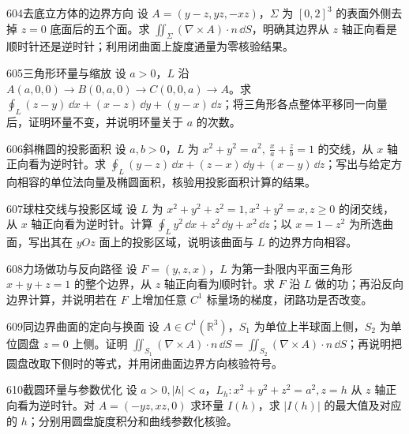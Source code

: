 \begin{exercise}{604}{去底立方体的边界方向}
设 $A=(y-z,yz,-xz)$，$\Sigma$ 为 $[0,2]^3$ 的表面外侧去掉 $z=0$ 底面后的五个面。求 $\iint_{\Sigma}(\nabla\times A)\cdot n\,\dd S$，明确其边界从 $z$ 轴正向看是顺时针还是逆时针；利用闭曲面上旋度通量为零核验结果。
\end{exercise}
\begin{exercise}{605}{三角形环量与缩放}
设 $a>0$，$L$ 沿 $A(a,0,0)\to B(0,a,0)\to C(0,0,a)\to A$。求 $\oint_L(z-y)\,\dd x+(x-z)\,\dd y+(y-x)\,\dd z$；将三角形各点整体平移同一向量后，证明环量不变，并说明环量关于 $a$ 的次数。
\end{exercise}
\begin{exercise}{606}{斜椭圆的投影面积}
设 $a,b>0$，$L$ 为 $x^2+y^2=a^2,\ \frac xa+\frac zb=1$ 的交线，从 $x$ 轴正向看为逆时针。求 $\oint_L(y-z)\,\dd x+(z-x)\,\dd y+(x-y)\,\dd z$；写出与给定方向相容的单位法向量及椭圆面积，核验用投影面积计算的结果。
\end{exercise}
\begin{exercise}{607}{球柱交线与投影区域}
设 $L$ 为 $x^2+y^2+z^2=1,x^2+y^2=x,z\ge0$ 的闭交线，从 $x$ 轴正向看为逆时针。计算 $\oint_Ly^2\,\dd x+z^2\,\dd y+x^2\,\dd z$；以 $x=1-z^2$ 为所选曲面，写出其在 $yOz$ 面上的投影区域，说明该曲面与 $L$ 的边界方向相容。
\end{exercise}
\begin{exercise}{608}{力场做功与反向路径}
设 $F=(y,z,x)$，$L$ 为第一卦限内平面三角形 $x+y+z=1$ 的整个边界，从 $z$ 轴正向看为顺时针。求 $F$ 沿 $L$ 做的功；再沿反向边界计算，并说明若在 $F$ 上增加任意 $C^1$ 标量场的梯度，闭路功是否改变。
\end{exercise}
\begin{exercise}{609}{同边界曲面的定向与换面}
设 $A\in C^1(\mathbb R^3)$，$S_1$ 为单位上半球面上侧，$S_2$ 为单位圆盘 $z=0$ 上侧。证明 $\iint_{S_1}(\nabla\times A)\cdot n\,\dd S=\iint_{S_2}(\nabla\times A)\cdot n\,\dd S$；再说明把圆盘改取下侧时的等式，并用闭曲面边界方向核验符号。
\end{exercise}
\begin{exercise}{610}{截圆环量与参数优化}
设 $a>0,|h|<a$，$L_h:x^2+y^2+z^2=a^2,z=h$ 从 $z$ 轴正向看为逆时针。对 $A=(-yz,xz,0)$ 求环量 $I(h)$，求 $|I(h)|$ 的最大值及对应的 $h$；分别用圆盘旋度积分和曲线参数化核验。
\end{exercise}
